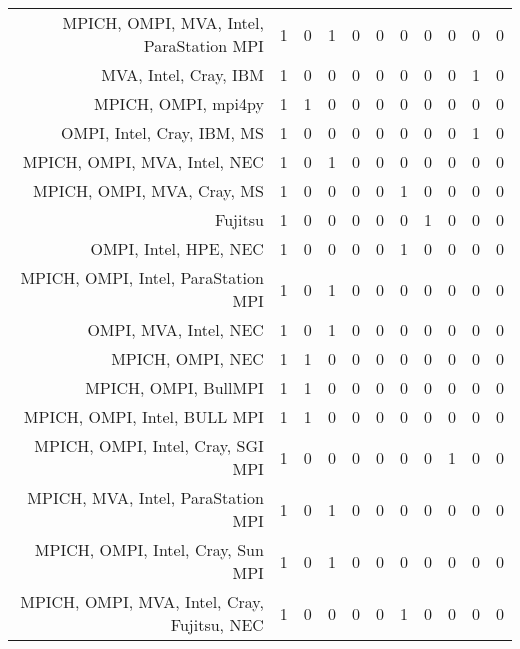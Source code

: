 {\begin{landscape}
\begin{longtable}[htb]{r|c|c|c|c|c|c|c|c|c|c}
{MPICH, OMPI, MVA, Intel, ParaStation MPI} & 1 & 0 & 1 & 0 & 0 & 0 & 0 & 0 & 0 & 0 \\%
{MVA, Intel, Cray, IBM} & 1 & 0 & 0 & 0 & 0 & 0 & 0 & 0 & 1 & 0 \\%
{MPICH, OMPI, mpi4py} & 1 & 1 & 0 & 0 & 0 & 0 & 0 & 0 & 0 & 0 \\%
{OMPI, Intel, Cray, IBM, MS} & 1 & 0 & 0 & 0 & 0 & 0 & 0 & 0 & 1 & 0 \\%
{MPICH, OMPI, MVA, Intel, NEC} & 1 & 0 & 1 & 0 & 0 & 0 & 0 & 0 & 0 & 0 \\%
{MPICH, OMPI, MVA, Cray, MS} & 1 & 0 & 0 & 0 & 0 & 1 & 0 & 0 & 0 & 0 \\%
{Fujitsu} & 1 & 0 & 0 & 0 & 0 & 0 & 1 & 0 & 0 & 0 \\%
{OMPI, Intel, HPE, NEC} & 1 & 0 & 0 & 0 & 0 & 1 & 0 & 0 & 0 & 0 \\%
{MPICH, OMPI, Intel, ParaStation MPI} & 1 & 0 & 1 & 0 & 0 & 0 & 0 & 0 & 0 & 0 \\%
{OMPI, MVA, Intel, NEC} & 1 & 0 & 1 & 0 & 0 & 0 & 0 & 0 & 0 & 0 \\%
{MPICH, OMPI, NEC} & 1 & 1 & 0 & 0 & 0 & 0 & 0 & 0 & 0 & 0 \\%
{MPICH, OMPI, BullMPI} & 1 & 1 & 0 & 0 & 0 & 0 & 0 & 0 & 0 & 0 \\%
{MPICH, OMPI, Intel, BULL MPI} & 1 & 1 & 0 & 0 & 0 & 0 & 0 & 0 & 0 & 0 \\%
{MPICH, OMPI, Intel, Cray, SGI MPI} & 1 & 0 & 0 & 0 & 0 & 0 & 0 & 1 & 0 & 0 \\%
{MPICH, MVA, Intel, ParaStation MPI} & 1 & 0 & 1 & 0 & 0 & 0 & 0 & 0 & 0 & 0 \\%
{MPICH, OMPI, Intel, Cray, Sun MPI} & 1 & 0 & 1 & 0 & 0 & 0 & 0 & 0 & 0 & 0 \\%
{MPICH, OMPI, MVA, Intel, Cray, Fujitsu, NEC} & 1 & 0 & 0 & 0 & 0 & 1 & 0 & 0 & 0 & 0 \\%
\hline%
\end{longtable}%
\end{landscape}}%
\clearpage%
